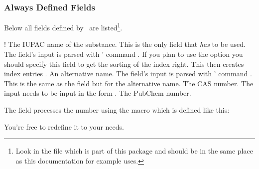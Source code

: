 \documentclass[load-preamble+]{cnltx-doc}
\begin{document}
\subsubsection{Always Defined Fields}
Below all fields defined by \substances\ are listed\footnote{Look in the file
   which is part of this
  package and should be in the same place as this documentation for example
  uses.}.
\begin{options}
  \Default!
    The \acs{IUPAC} name of the substance. This is the only field that
    \emph{has} to be used. The field's input is parsed with
    ' command .
    If you plan to use the  option you should specify this field
    to get the sorting of the index right. This then creates index entries
    .
    An alternative name. The field's input is parsed with '
    command .
    This is the same as the  field but for the alternative name.
    The \ac{CAS} number. The input needs to be input in the form
    .
    The PubChem number.
\end{options}

The  field processes the number using the macro
 which is defined like this:
\begin{sourcecode}
  \def\@CAS#1-#2-#3\relax{}
  \NewDocumentCommand{}
\end{sourcecode}
You're free to redefine it to your needs.
\end{document}
